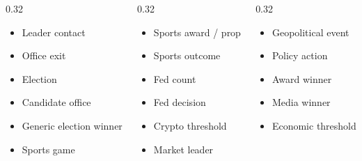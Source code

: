 \documentclass[aspectratio=169,10pt]{beamer}
\newcommand{\tightitem}{\setlength\itemsep{0.25em}}
\begin{document}
\begin{frame}
\small
\begin{columns}[T,onlytextwidth]
\begin{column}{0.32\textwidth}
\begin{itemize}
\tightitem
\item Leader contact
\item Office exit
\item Election
\item Candidate office
\item Generic election winner
\item Sports game
\end{itemize}
\end{column}
\begin{column}{0.32\textwidth}
\begin{itemize}
\tightitem
\item Sports award / prop
\item Sports outcome
\item Fed count
\item Fed decision
\item Crypto threshold
\item Market leader
\end{itemize}
\end{column}
\begin{column}{0.32\textwidth}
\begin{itemize}
\tightitem
\item Geopolitical event
\item Policy action
\item Award winner
\item Media winner
\item Economic threshold
\end{itemize}
\end{column}
\end{columns}
\end{frame}
\end{document}
